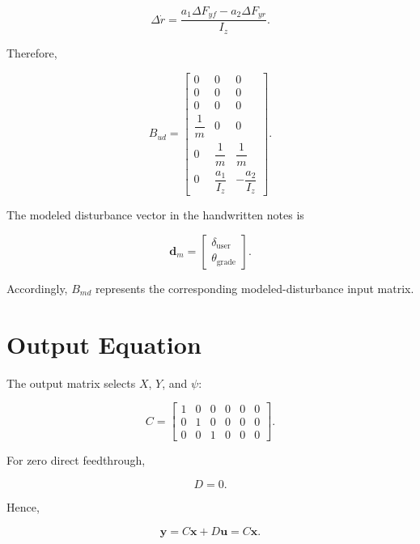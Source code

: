 \documentclass[12pt,a4paper]{article}
\begin{document}
\begin{equation}
\Delta\dot r
=
\frac{
a_1\Delta F_{yf}
-
a_2\Delta F_{yr}
}{I_z}.
\end{equation}

Therefore,

\begin{equation}
\boxed{
B_{ud}
=
\begin{bmatrix}
0&0&0\\
0&0&0\\
0&0&0\\
\dfrac{1}{m}&0&0\\
0&\dfrac{1}{m}&\dfrac{1}{m}\\
0&\dfrac{a_1}{I_z}&-\dfrac{a_2}{I_z}
\end{bmatrix}
}.
\end{equation}

The modeled disturbance vector in the handwritten notes is

\begin{equation}
\boxed{
\bm{d}_m
=
\begin{bmatrix}
\delta_{\mathrm{user}}\\
\theta_{\mathrm{grade}}
\end{bmatrix}
}.
\end{equation}

Accordingly, $B_{md}$ represents the corresponding modeled-disturbance
input matrix.

\section{Output Equation}

The output matrix selects $X$, $Y$, and $\psi$:

\begin{equation}
\boxed{
C
=
\begin{bmatrix}
1&0&0&0&0&0\\
0&1&0&0&0&0\\
0&0&1&0&0&0
\end{bmatrix}
}.
\end{equation}

For zero direct feedthrough,

\begin{equation}
\boxed{
D=0
}.
\end{equation}

Hence,

\begin{equation}
\boxed{
\bm{y}
=
C\bm{x}
+
D\bm{u}
=
C\bm{x}
}.
\end{equation}
\end{document}
